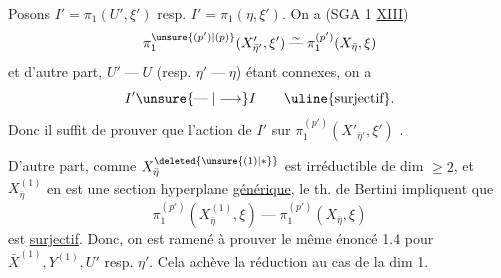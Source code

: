 Posons $I'=\pi_1(U',\xi')$ resp. $I'=\pi_1(\eta,\xi')$. On a (SGA 1 \uline{XIII})
\[
\pi_1^{\unsure{(p')|(p)}}(X'_{\bar\eta'},\xi')\mathrel{\overset{\sim}{\text{---}}}\pi_1^{(p')}(X_{\bar\eta},\xi)
\]
 et d'autre part, $U'\mathrel{\text{---}}U$ (resp. $\eta'\mathrel{\text{---}}\eta$) étant connexes, on a
\[
I'\unsure{\mathrel{\text{---}}|\longrightarrow}I\qquad\text{\uline{surjectif}}.
\]
Donc il suffit de prouver que l'action  de $I'$ sur $\pi_1^{(p')}(X'_{\bar\eta'},\xi')$  .

D'autre part, comme $X_{\bar\eta}^{\deleted{\unsure{(1)|*}}}$ est irréductible de dim $\geq2$, et $X^{(1)}_{\bar\eta}$ en est une section hyperplane \uline{générique}, le th. de Bertini  impliquent que
\[
\pi_1^{(p')}(X^{(1)}_{\bar\eta},\xi)\mathrel{\text{---}}\pi_1^{(p')}(X_{\bar\eta},\xi)
\]
est \uline{surjectif}. Donc, on est ramené à prouver le même énoncé 1.4 pour $\bar X^{(1)},Y^{(1)},U'$ resp. $\eta'$.
Cela achève la réduction au cas de la dim 1.
